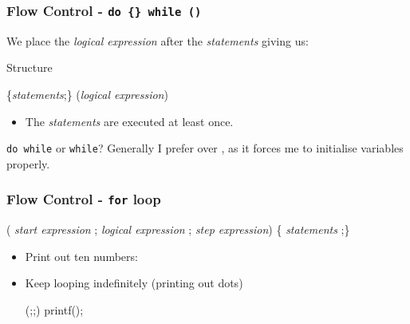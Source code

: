 \documentclass[smaller,table]{beamer} %
\begin{document}
\begin{frame}[fragile]
\frametitle{Flow Control - {\tt do \{\} while ()}}
We place the \emph{logical expression} after the \emph{statements} giving us:
\begin{block}{Structure}
\begin{semiverbatim}
    \{\emph{statements};\}
    (\emph{logical expression})
\end{semiverbatim}
\end{block}
\begin{itemize}
\item The \emph{statements} are executed at least once.
\end{itemize}
\begin{exampleblock}{{\tt do while} or {\tt while}?}
Generally I prefer {\tt {}} over {\tt {}}, as it forces me to initialise variables properly.
\end{exampleblock}
\end{frame}

\begin{frame}[fragile]
\frametitle{Flow Control - {\tt for} loop}
\begin{block}{}
\begin{semiverbatim}
    ( \emph{start expression} ;
         \emph{logical expression} ;
         \emph{step expression})
         \{ \emph{statements} ;\}
\end{semiverbatim}
\end{block}
\begin{itemize}
\item Print out ten numbers:
\item Keep looping indefinitely (printing out dots)
\begin{semiverbatim}
    (;;) printf();
\end{semiverbatim}
\end{itemize}
\end{frame}
\end{document}

